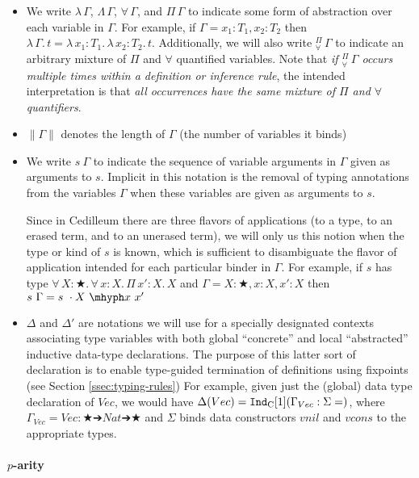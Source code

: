 \documentclass{article}
\newcommand{\ann}[2]{#1\! : \! #2}
\newcommand{\abs}[4]{{#1}\, #2\! : \! #3.\, #4}
\newcommand{\absu}[3]{{#1}\, #2.\, #3}
\newcommand{\indast}[5]{\texttt{Ind}_{#1} [#2] (#3 : #4 = #5)}
\newcommand{\lenc}[1]{\|#1\|}
\newcommand{\piforall}{^{\Pi}_{\forall}}
\begin{document}
\begin{itemize}
\item We write $\lambda\,\Gamma$, $\Lambda\,\Gamma$, $\forall\,\Gamma$, and
  $\Pi\,\Gamma$ to indicate some form of abstraction over each variable in
  $\Gamma$. For example, if $\Gamma = \ann{x_1}{T_1},\ann{x_2}{T_2}$ then
  $\absu{\lambda}{\Gamma}{t} =
  \abs{\lambda}{x_1}{T_1}{\abs{\lambda}{x_2}{T_2}{t}}$. Additionally, we
  will also write $\piforall\,\Gamma$ to indicate an arbitrary mixture of $\Pi$
  and $\forall$ quantified variables. Note that \textit{if $\piforall\,\Gamma$
  occurs multiple times within a definition or inference rule}, the intended
  interpretation is that \textit{all occurrences have the same mixture of $\Pi$
    and $\forall$ quantifiers}.
\item $\lenc{\Gamma}$ denotes the length of $\Gamma$ (the number of variables it
  binds)
\item We write $s\ \Gamma$ to indicate the sequence of variable arguments in
  $\Gamma$ given as arguments to $s$. Implicit in this notation is the removal
  of typing annotations from the variables $\Gamma$ when these variables are
  given as arguments to $s$.

  Since in Cedilleum there are three flavors of applications (to a type, to an
  erased term, and to an unerased term), we will only us this notion when the type
  or kind of $s$ is known, which is sufficient to disambiguate the flavor of
  application intended for each particular binder in $\Gamma$. For example,
  if $s$ has type
  $\abs{\forall}{X}{★}{\abs{\forall}{x}{X}{\abs{\Pi}{x'}{X}{X}}}$ and $\Gamma =
  \ann{X}{★},\ann{x}{X},\ann{x'}{X}$ then $s\ \Gamma = s\ \cdot X\ \mhyph x\ x'$
\item $\Delta$ and $\Delta'$ are notations we will use
  for a specially designated contexts associating type variables with both global
  ``concrete'' and local ``abstracted'' inductive data-type declarations.
  The purpose of this latter sort of declaration is to enable type-guided
  termination of definitions using fixpoints (see Section \ref{ssec:typing-rules}) For example, given
  just the (global) data type declaration of $Vec$, we would have $\Delta(Vec) =
  \indast{\text{C}}{1}{\Gamma_{Vec}}{\Sigma}$, where $\Gamma_{Vec} = \ann{Vec}{★ ➔ Nat ➔
    ★}$ and  $\Sigma$ binds data constructors $vnil$ and $vcons$ to the
  appropriate types.
\end{itemize}

\paragraph{$p$-arity}
\end{document}

